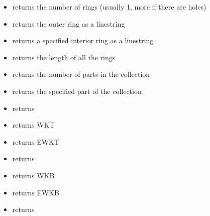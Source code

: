 \documentclass[a4paper,11pt,english]{sphinxmanual}
\begin{document}
\begin{itemize}
\item {} 
 returns the number of rings (usually 1, more if there are holes)

\item {} 
 returns the outer ring as a linestring

\item {} 
 returns a specified interior ring as a linestring

\item {} 
 returns the length of all the rings

\item {} 
 returns the number of parts in the collection

\item {} 
 returns the specified part of the collection

\item {} 
 returns 

\item {} 
 returns WKT 

\item {} 
 returns EWKT 

\item {} 
 returns 

\item {} 
 returns WKB 

\item {} 
 returns EWKB 

\item {} 
 returns 


\end{itemize}
\end{document}
